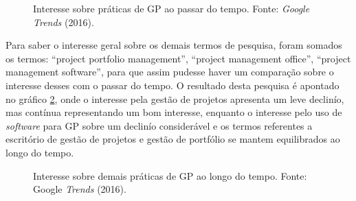 \begin{figure}[!ht]
  \centering
  \caption{Interesse sobre práticas de GP ao passar do tempo. Fonte: \textit{Google Trends} (2016).}
  \label{trends1}
\end{figure}


Para saber o interesse geral sobre os demais termos de pesquisa, foram somados os termos: ``project portfolio management'', ``project management office'', ``project management software'', para que assim pudesse haver um comparação sobre o interesse desses com o passar do tempo. O resultado desta pesquisa é apontado no gráfico \ref{trends2}, onde o interesse pela gestão de projetos apresenta um leve declinío, mas contínua representando um bom interesse, enquanto o interesse pelo uso de \textit{software} para GP sobre um declinío considerável e os termos referentes a escritório de gestão de projetos e gestão de portfólio se mantem equilibrados ao longo do tempo.

\begin{figure}[!ht]
  \centering
  \caption{Interesse sobre demais práticas de GP ao longo do tempo. Fonte: Google \textit{Trends} (2016).}
  \label{trends2}
\end{figure}


